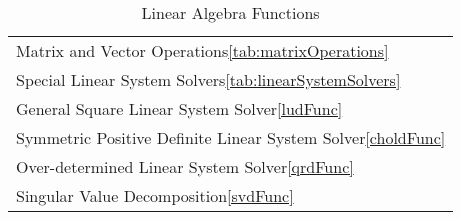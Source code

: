 \begin{table}[H]
\caption{Linear Algebra Functions}
\label{tab:linearAlgebraFunctions}
\begin{center}
\begin{tabular}{l}
Matrix and Vector Operations\ref{tab:matrixOperations}\\
Special Linear System Solvers\ref{tab:linearSystemSolvers}\\
General Square Linear System Solver\ref{ludFunc}\\
Symmetric Positive Definite Linear System Solver\ref{choldFunc}\\
Over-determined Linear System Solver\ref{qrdFunc}\\
Singular Value Decomposition\ref{svdFunc}\\
\end{tabular}
\end{center}
\label{default}
\end{table}%
